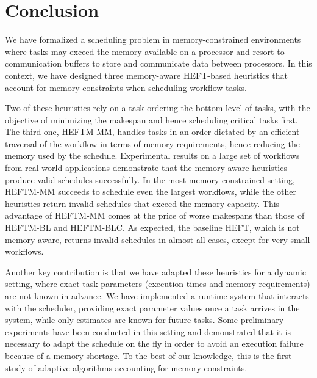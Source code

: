 \documentclass[conference]{IEEEtran}
\newcommand{\algo}[1]{\textsc{#1}}
\newcommand{\heft}{\algo{HEFT}\xspace}
\newcommand{\heftmm}{\algo{HEFTM-MM}\xspace}
\newcommand{\heftbl}{\algo{HEFTM-BL}\xspace}
\newcommand{\heftblc}{\algo{HEFTM-BLC}\xspace}
\begin{document}

\bigskip
\section{Conclusion}
\label{sec:conc}

We have formalized a scheduling problem in memory-constrained environments where tasks
may exceed the memory available on a processor and resort to communication buffers
to store and communicate data between processors. In this context, we have 
designed three memory-aware HEFT-based heuristics that account for memory
constraints when scheduling workflow tasks. 

Two of these heuristics rely on a task ordering \wrt the bottom level of tasks, with the objective
of minimizing the makespan and hence scheduling critical tasks first. The third one, \heftmm,
handles tasks in an order dictated by an efficient traversal
of the workflow in terms of memory requirements, hence reducing the memory used
by the schedule. Experimental results on a large set of workflows from real-world applications
demonstrate that the memory-aware heuristics produce valid schedules successfully. 
In the most memory-constrained setting, \heftmm succeeds to schedule even the largest workflows,
while the other heuristics return invalid schedules that exceed the memory capacity. 
This advantage of \heftmm comes at the price of worse makespans than those of \heftbl
and \heftblc. %
As expected, the baseline \heft, which is not memory-aware, returns invalid schedules in almost
all cases, except for very small workflows. 

%

Another key contribution is that we have adapted these heuristics for a dynamic setting, where exact
task parameters (execution times and memory requirements) are not known in advance. 
We have implemented a runtime system that interacts with the scheduler, providing exact
parameter values once a task arrives in the system, while only estimates are known for future tasks. 
Some preliminary experiments have been conducted in this setting and demonstrated that
it is necessary to adapt the schedule on the fly in order to avoid an execution failure because
of a memory shortage. To the best of our knowledge, this is the first study of adaptive
algorithms accounting for memory constraints. 
\end{document}
